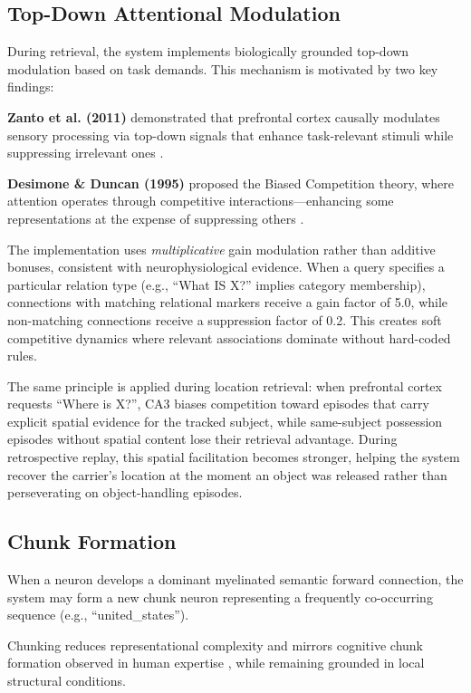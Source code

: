 \documentclass[11pt]{article}
\begin{document}
\subsection{Top-Down Attentional Modulation}

During retrieval, the system implements biologically grounded top-down modulation
based on task demands. This mechanism is motivated by two key findings:

\textbf{Zanto et al. (2011)} demonstrated that prefrontal cortex causally modulates
sensory processing via top-down signals that enhance task-relevant stimuli while
suppressing irrelevant ones \citep{zanto2011causal}.

\textbf{Desimone \& Duncan (1995)} proposed the Biased Competition theory, where
attention operates through competitive interactions---enhancing some representations
at the expense of suppressing others \citep{desimone1995neural}.

The implementation uses \emph{multiplicative} gain modulation rather than additive bonuses,
consistent with neurophysiological evidence. When a query specifies a particular relation
type (e.g., ``What IS X?'' implies category membership), connections with matching
relational markers receive a gain factor of 5.0, while non-matching connections
receive a suppression factor of 0.2. This creates soft competitive dynamics where
relevant associations dominate without hard-coded rules.

The same principle is applied during location retrieval: when prefrontal cortex requests
``Where is X?'', CA3 biases competition toward episodes that carry explicit spatial evidence
for the tracked subject, while same-subject possession episodes without spatial content lose
their retrieval advantage. During retrospective replay, this spatial facilitation becomes
stronger, helping the system recover the carrier's location at the moment an object was
released rather than perseverating on object-handling episodes.

\subsection{Chunk Formation}

When a neuron develops a dominant myelinated semantic forward connection, the
system may form a new chunk neuron representing a frequently co-occurring sequence
(e.g., ``united\_states'').

Chunking reduces representational complexity and mirrors cognitive chunk formation
observed in human expertise \citep{chase1973perception}, while remaining grounded in local structural conditions.
\end{document}
